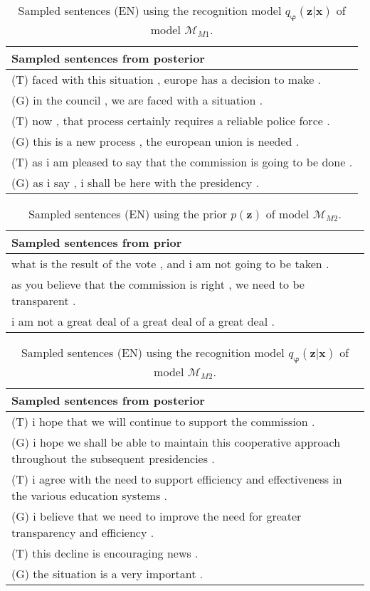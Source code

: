 \begin{table}
  \centering
  \begin{tabular}{|L{14cm}|} 
    \hline
    Sampled sentences from posterior\\ [0.5ex] 
    \hline\hline
    (T) faced with this situation , europe has a decision to make .\\
    (G) in the council , we are faced with a situation .\\
    \hline
    (T) now , that process certainly requires a reliable police force .\\
    (G) this is a new process , the european union is needed .\\
    \hline
    (T) as i am pleased to say that the commission is going to be done .\\
    (G) as i say , i shall be here with the presidency .\\
    \hline
  \end{tabular}
  \caption{Sampled sentences (EN) using the recognition model
    $q_{\bm{\varphi}}(\bm{z} | \bm{x})$ of model $\mathcal{M}_{M1}$.}
\end{table}

\begin{table}
  \centering
  \begin{tabular}{|L{14cm}|} 
    \hline
    Sampled sentences from prior\\ [0.5ex] 
    \hline\hline
    what is the result of the vote , and i am not going to be taken .\\
    \hline
    as you believe that the commission is right , we need to be transparent .\\
    \hline
    i am not a great deal of a great deal of a great deal .\\
    \hline
  \end{tabular}
  \caption{Sampled sentences (EN) using the prior $p(\bm{z})$ of model $\mathcal{M}_{M2}$.}
\end{table}

\begin{table}
  \centering
  \begin{tabular}{|L{14cm}|} 
    \hline
    Sampled sentences from posterior\\ [0.5ex] 
    \hline\hline
    (T) i hope that we will continue to support the commission .\\
    (G) i hope we shall be able to maintain this cooperative approach throughout the subsequent presidencies .\\
    \hline
    (T) i agree with the need to support efficiency and effectiveness in the various education systems .\\
    (G) i believe that we need to improve the need for greater transparency and efficiency .\\
    \hline
    (T) this decline is encouraging news .\\
    (G) the situation is a very important .\\
    \hline
  \end{tabular}
  \caption{Sampled sentences (EN) using the recognition model
    $q_{\bm{\varphi}}(\bm{z} | \bm{x})$ of model $\mathcal{M}_{M2}$.}
\end{table}

